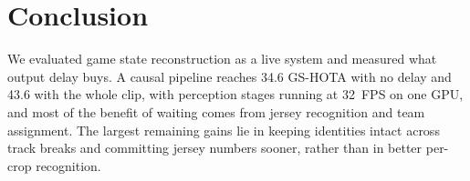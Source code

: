 \documentclass[conference]{IEEEtran}
\begin{document}
\section{Conclusion}
We evaluated game state reconstruction as a live system and measured what output delay buys. A causal pipeline reaches 34.6 GS-HOTA with no delay and 43.6 with the whole clip, with perception stages running at 32~FPS on one GPU, and most of the benefit of waiting comes from jersey recognition and team assignment. The largest remaining gains lie in keeping identities intact across track breaks and committing jersey numbers sooner, rather than in better per-crop recognition.

\IEEEtriggercmd{\balance}


\end{document}
